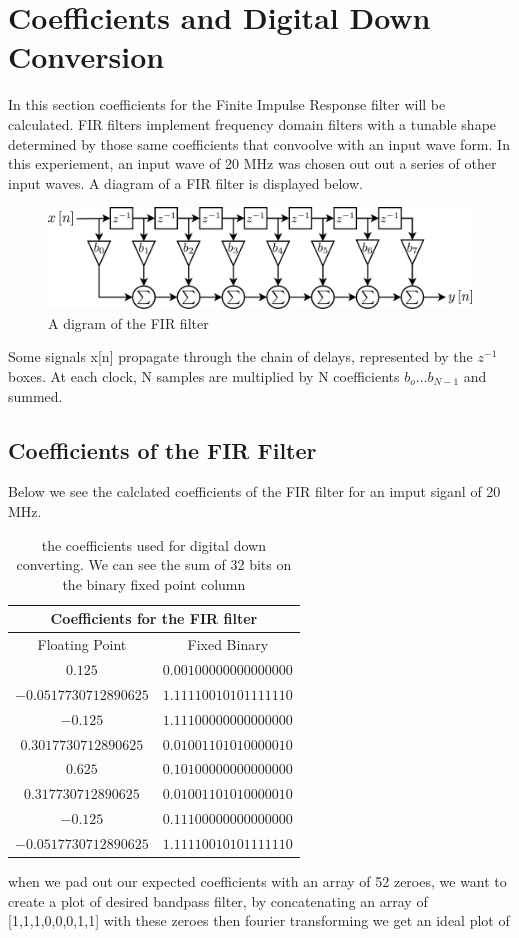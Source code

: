 \documentclass[12 pt]{article}
\begin{document}
\section{Coefficients and Digital Down Conversion}
In this section coefficients for the Finite Impulse Response filter will
be calculated. 
FIR filters implement frequency domain filters with a tunable shape determined
by those same coefficients that convoolve with an input wave form. In
this experiement, an input wave of 20 MHz was chosen out out a series of
other input waves.  A diagram of a FIR filter is displayed below.
\begin{figure}[H]
\center
\includegraphics[scale=0.4]{fir-filter.pdf}
\caption{A digram of the FIR filter}
\label{fir-filter}
\end{figure}
 Some signals x[n] propagate through the chain of delays, represented by
 the $z^{-1}$ boxes.  At each clock, N samples are multiplied by N
 coefficients $b_{o}...b_{N-1}$ and summed. 

\subsection{Coefficients of the FIR Filter}
Below we see the calclated coefficients of the FIR filter for an imput
siganl of 20 MHz.

\begin{table}[H]
\center
\begin{tabular}{|c|c|}
\hline
\multicolumn{2}{|c|}{Coefficients for the FIR filter}\\
\hline
Floating Point & Fixed Binary \\
\hline
$0.125$ & $0.00100000000000000$ \\
\hline
$-0.0517730712890625$ & $1.11110010101111110$ \\
\hline
$-0.125$ & $1.11100000000000000$ \\
\hline
$0.3017730712890625$ & $0.01001101010000010$ \\
\hline 
$0.625$ & $0.10100000000000000$ \\
\hline
$0.317730712890625$ & $0.01001101010000010$ \\
\hline
$-0.125$ & $0.11100000000000000$ \\
\hline
$-0.0517730712890625$ & $1.11110010101111110$ \\
\hline
\end{tabular}
\caption{the coefficients used for digital down converting. We can see
  the sum of 32 bits on the binary fixed point column}
\label{coef table}
\end{table}
 when we pad out our expected coefficients with an array of 52 zeroes,
 we want to create a plot of desired bandpass filter, by concatenating
 an array of [1,1,1,0,0,0,1,1] with these zeroes then fourier
 transforming we get an ideal plot of 
\end{document}
